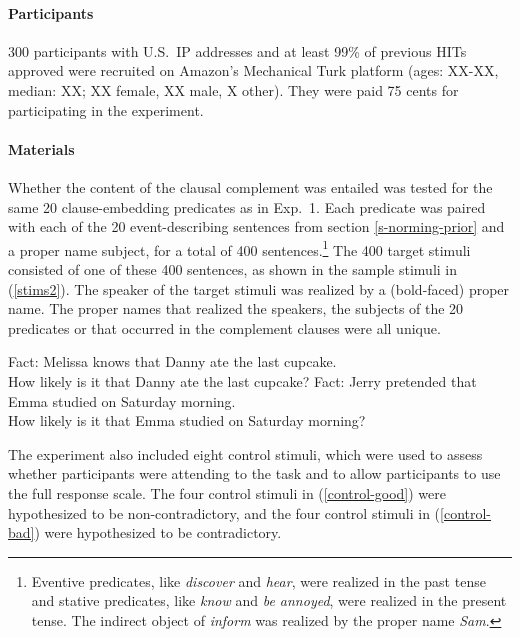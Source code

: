 \documentclass[11pt,fleqn]{article}
\newcommand{\6}{\mbox{$[\hspace*{-.6mm}[$}}
\newcommand{\9}{\mbox{$]\hspace*{-.6mm}]$}}
\begin{document}
\paragraph{Participants} 300 participants with U.S.\ IP addresses and at least 99\% of previous HITs approved were recruited on Amazon's Mechanical Turk platform (ages: XX-XX, median: XX; XX female, XX male, X other). They were paid 75 cents for participating in the experiment.

\paragraph{Materials} Whether the content of the clausal complement was entailed was tested for the same 20 clause-embedding predicates as in Exp.~1. Each predicate was paired with each of the 20 event-describing sentences from section \ref{s-norming-prior} and a proper name subject, for a total of 400 sentences.\footnote{Eventive predicates, like {\em discover} and {\em hear}, were realized in the past tense and stative predicates, like {\em know} and {\em be annoyed}, were realized in the present tense. The indirect object of {\em inform} was realized by the proper name {\em Sam}.} The 400 target stimuli consisted of one of these 400 sentences, as shown in the sample stimuli in (\ref{stims2}). The speaker of the target stimuli was realized by a (bold-faced) proper name. The proper names that realized the speakers, the subjects of the 20 predicates or that occurred in the complement clauses were all unique. 

\begin{exe}
\ex\label{stims2}
\begin{xlist}
\ex Fact: Melissa knows that Danny ate the last cupcake.
\\ How likely is it that Danny ate the last cupcake?
\ex Fact: Jerry pretended that Emma studied on Saturday morning.
\\ How likely is it that Emma studied on Saturday morning?
\end{xlist}
\end{exe}

The experiment also included eight control stimuli, which were used to assess whether participants were attending to the task and to allow participants to use the full response scale. The four control stimuli in (\ref{control-good}) were hypothesized to be non-contradictory, and the four control stimuli in (\ref{control-bad}) were hypothesized to be contradictory.
\end{document}
